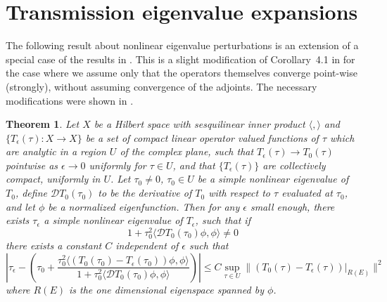\documentclass[10pt,a4paper]{amsart}
\newtheorem{theorem}{Theorem}
\begin{document}
\section{Transmission eigenvalue expansions} 
The following result about nonlinear eigenvalue perturbations is an extension of a special case of the results in \cite{Os}. This is a slight modification of Corollary~4.1 in \cite{Mo} for the case where we assume only that the operators themselves converge point-wise (strongly), without assuming convergence of the adjoints. The necessary modifications were shown in \cite{FuMo}.  \begin{theorem}
\label{Osbornnonlinear}
Let $X$ be a Hilbert space with sesquilinear inner product $\langle, \rangle$ and $ \{T_\epsilon(\tau):X \rightarrow X\}$ be a set of compact linear operator valued functions of $\tau$ which are analytic in a region $U$ of the complex plane, such that $T_\epsilon(\tau)\rightarrow T_0(\tau)$ pointwise as $\epsilon \rightarrow 0$ uniformly for $\tau \in U$, and that $\{ T_\epsilon(\tau)\}$ are collectively compact, uniformly in $U$.  Let $\tau_0 \neq0$, 
$\tau_0 \in U$ be a simple nonlinear eigenvalue of $T_0$, define ${\mathcal D}T_0(\tau_0)$ to be the derivative of $T_0$ with respect to $\tau$ evaluated at $\tau_0$, and let $\phi$ be a normalized eigenfunction. Then for any $\epsilon$ small enough, there exists $\tau_\epsilon$ a simple nonlinear eigenvalue of $T_\epsilon$, such that if
\begin{equation*}
1+\tau_{0}^2\langle {\mathcal D}T_0(\tau_0) \phi,\phi \rangle \neq 0
\end{equation*}
there exists a constant $C$ independent of $\epsilon$ such that   
\begin{equation}\label{eq:lmh}
\left| \tau_\epsilon - \left(\tau_0+ \dfrac{\tau_{0}^2\langle \left(T_0(\tau_0)-T_\epsilon(\tau_0)\right) \phi,\phi \rangle}{1+ \tau_0^2\langle {\mathcal D}T_0(\tau_0) \phi,\phi \rangle} \right)\right| \leq 
 C \sup_{\tau \in U}\|  (T_0(\tau)-T_\epsilon(\tau))|_{R(E)}\|^2
\end{equation}
where $R(E)$ is the one dimensional eigenspace spanned by $\phi$. 
\end{theorem}
\end{document}
